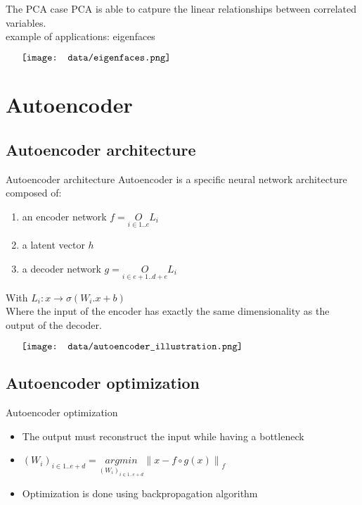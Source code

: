 \documentclass{beamer}
\newcommand{\norm}[1]{\left\lVert#1\right\rVert}
\begin{document}
\begin{frame}{The PCA case}
    PCA is able to catpure the linear relationships between correlated variables. \\
    example of applications: eigenfaces \\
    \begin{minipage}{6in}
    \centering
    $\vcenter{
    \texttt{[image: data/eigenfaces.png]}
    }$
    \end{minipage}
\end{frame}


\section{Autoencoder}
\subsection{Autoencoder architecture}
\begin{frame}{Autoencoder architecture}
    Autoencoder is a specific neural network architecture composed of:
    \begin{enumerate}
	\item an encoder network $f = \underset{i \in {{1 .. e}}}{O} L_i$
        \item a latent vector $h$
	\item a decoder network $g = \underset{i \in {{e + 1 .. d + e}}}{O} L_i$
    \end{enumerate}
    With $L_i : x \rightarrow \sigma(W_i.x + b)$ \\
    Where the input of the encoder has exactly the same dimensionality as the output of the decoder. \\
    \begin{minipage}{6in}
    \centering
    $\vcenter{
    \texttt{[image: data/autoencoder\_illustration.png]}
    }$
    \end{minipage}
\end{frame}

\subsection{Autoencoder optimization}
\begin{frame}{Autoencoder optimization}
	\begin{itemize}
		\item The output must reconstruct the input while having a bottleneck
		\item $(W_i)_{i \in {1 .. e+d}} = \underset{(W_i)_{i \in {1 .. e+d}}}{argmin} \norm{ x - f \circ g(x)}_f$
		\item Optimization is done using backpropagation algorithm
	\end{itemize}
\end{frame}
\end{document}
